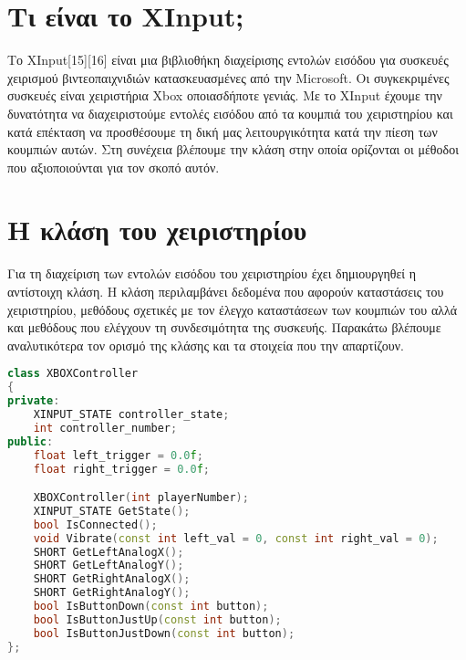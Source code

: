 



\section{Τι είναι το XInput;}
Το XInput[15][16] είναι μια βιβλιοθήκη διαχείρισης εντολών εισόδου για
συσκευές χειρισμού βιντεοπαιχνιδιών κατασκευασμένες από την Microsoft.
Οι συγκεκριμένες συσκευές είναι χειριστήρια Xbox οποιασδήποτε γενιάς. Με
το XInput έχουμε την δυνατότητα να διαχειριστούμε εντολές εισόδου από τα
κουμπιά του χειριστηρίου και κατά επέκταση να προσθέσουμε τη δική μας λειτουργικότητα
κατά την πίεση των κουμπιών αυτών. Στη συνέχεια βλέπουμε την κλάση στην οποία ορίζονται
οι μέθοδοι που αξιοποιούνται για τον σκοπό αυτόν.

\section{Η κλάση του χειριστηρίου}

Για τη διαχείριση των εντολών εισόδου του χειριστηρίου έχει δημιουργηθεί
η αντίστοιχη κλάση. Η κλάση περιλαμβάνει δεδομένα που αφορούν καταστάσεις
του χειριστηρίου, μεθόδους σχετικές με τον έλεγχο καταστάσεων των κουμπιών
του αλλά και μεθόδους που ελέγχουν τη συνδεσιμότητα της συσκευής. Παρακάτω
βλέπουμε αναλυτικότερα τον ορισμό της κλάσης και τα στοιχεία που την απαρτίζουν.

\begin{lstlisting}[language=C++, style=cppstyle]
class XBOXController
{
private:
    XINPUT_STATE controller_state;
    int controller_number;
public:
    float left_trigger = 0.0f;
    float right_trigger = 0.0f;

    XBOXController(int playerNumber);
    XINPUT_STATE GetState();
    bool IsConnected();
    void Vibrate(const int left_val = 0, const int right_val = 0);
    SHORT GetLeftAnalogX();
    SHORT GetLeftAnalogY();
    SHORT GetRightAnalogX();
    SHORT GetRightAnalogY();
    bool IsButtonDown(const int button);
    bool IsButtonJustUp(const int button);
    bool IsButtonJustDown(const int button);
};
\end{lstlisting}

